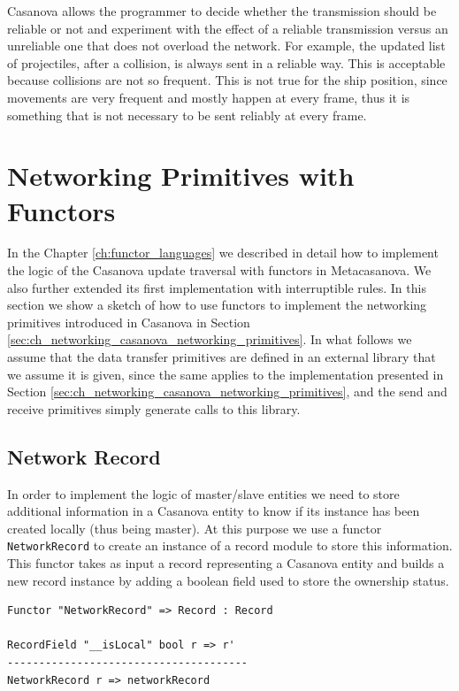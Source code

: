 Casanova allows the programmer to decide whether the transmission should be reliable or not and experiment with the effect of a reliable transmission versus an unreliable one that does not overload the network. For example, the updated list of projectiles, after a collision, is always sent in a reliable way. This is acceptable because collisions are not so frequent. This is not true for the ship position, since movements are very frequent and mostly happen at every frame, thus it is something that is not necessary to be sent reliably at every frame.

\section{Networking Primitives with Functors}
\label{sec:ch_networking_functor_networking}
In the Chapter \ref{ch:functor_languages} we described in detail how to implement the logic of the Casanova update traversal with functors in Metacasanova. We also further extended its first implementation with interruptible rules. In this section we show a sketch of how to use functors to implement the networking primitives introduced in Casanova in Section \ref{sec:ch_networking_casanova_networking_primitives}. In what follows we assume that the data transfer primitives are defined in an external library that we assume it is given, since the same applies to the implementation presented in Section \ref{sec:ch_networking_casanova_networking_primitives}, and the send and receive primitives simply generate calls to this library.

\subsection{Network Record}
\label{subsec:ch_networking_network_record}
In order to implement the logic of master/slave entities we need to store additional information in a Casanova entity to know if its instance has been created locally (thus being master). At this purpose we use a functor \texttt{NetworkRecord} to create an instance of a record module to store this information. This functor takes as input a record representing a Casanova entity and builds a new record instance by adding a boolean field used to store the ownership status.

\begin{lstlisting}
Functor "NetworkRecord" => Record : Record 

RecordField "__isLocal" bool r => r'
--------------------------------------
NetworkRecord r => networkRecord
\end{lstlisting}


